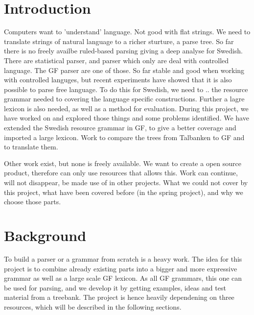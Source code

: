 \documentclass{report}
\begin{document}
\section{Introduction} 
Computers want to 'understand' language. Not good with flat strings.
We need to translate strings of natural language to a richer sturture,
a parse tree. So far there is no
freely availbe ruled-based parsing giving a deep analyse for Swedish.
There are statistical parser, and parser which only are deal with controlled language.
The GF parser are one of those. 
So far stable and good when working with controlled languges, but recent experiments
have showed that it is also possible to parse free language.
To do this for Swedish, we need to  .. the resource grammar needed to covering
the language specific constructions. Further a lagre lexicon is also needed, as well
as a method for evaluation.
During this project, we have worked on and explored those things and some problems identified.
We have extended the Swedish resource grammar in GF, to give a better coverage and imported
a large lexicon. Work to compare the trees from Talbanken to GF and to translate them.



Other work exist, but none is freely available. We want to create a open source
product, therefore can only use resources that allows this. Work can continue,
will not disappear, be made use of in other projects.
What we could not cover by this project, what have been covered before (in
the spring project), and why we choose those parts.

\section{Background}  
To build a parser or a grammar from scratch is a heavy work. The idea for this
project is to combine already existing parts into a bigger and more expressive grammar
as well as a large scale GF lexicon.
As all GF grammars, this one can be used for parsing, and we develop it by getting
examples, ideas and test material from a treebank.
The project is hence heavily dependening on three resources, which will be described
in the following sections.
\end{document}
